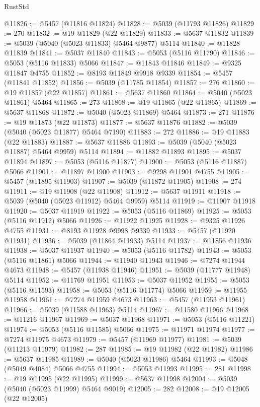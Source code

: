 \begin{lexlean}{RustStd}
\begin{coremodule}
@11826 := @5457 (@11816 @11824)
@11828 := @5039 (@11793 @11826)
@11829 := 270
@11832 := @19 @11829 (@22 @11829)
@11833 := @5637 @11832
@11839 := @5039 (@5040 (@5023 @11833) @5464 @9877) @5114
@11840 := @11828 @11839
@11841 := @5037 @11840
@11843 := @5053 (@5116 @11790)
@11846 := @5053 (@5116 @11833) @5066
@11847 := @11843 @11846
@11849 := @9325 @11847 @4755
@11852 := @8193 @11849 @9918 @9339
@11854 := @5457 (@11841 @11852)
@11856 := @5039 (@11785 @11854)
@11857 := 276
@11860 := @19 @11857 (@22 @11857)
@11861 := @5637 @11860
@11864 := @5040 (@5023 @11861) @5464
@11865 := 273
@11868 := @19 @11865 (@22 @11865)
@11869 := @5637 @11868
@11872 := @5040 (@5023 @11869) @5464
@11873 := 271
@11876 := @19 @11873 (@22 @11873)
@11877 := @5637 @11876
@11882 := @5039 (@5040 (@5023 @11877) @5464 @7190)
@11883 := 272
@11886 := @19 @11883 (@22 @11883)
@11887 := @5637 @11886
@11893 := @5039 (@5040 (@5023 @11887) @5464 @9959) @5114
@11894 := @11882 @11893
@11895 := @5037 @11894
@11897 := @5053 (@5116 @11877)
@11900 := @5053 (@5116 @11887) @5066
@11901 := @11897 @11900
@11903 := @9298 @11901 @4755
@11905 := @5457 (@11895 @11903)
@11907 := @5039 (@11872 @11905)
@11908 := 274
@11911 := @19 @11908 (@22 @11908)
@11912 := @5637 @11911
@11918 := @5039 (@5040 (@5023 @11912) @5464 @9959) @5114
@11919 := @11907 @11918
@11920 := @5037 @11919
@11922 := @5053 (@5116 @11869)
@11925 := @5053 (@5116 @11912) @5066
@11926 := @11922 @11925
@11928 := @9325 @11926 @4755
@11931 := @8193 @11928 @9998 @9339
@11933 := @5457 (@11920 @11931)
@11936 := @5039 (@11864 @11933) @5114
@11937 := @11856 @11936
@11938 := @5037 @11937
@11940 := @5053 (@5116 @11782)
@11943 := @5053 (@5116 @11861) @5066
@11944 := @11940 @11943
@11946 := @7274 @11944 @4673
@11948 := @5457 (@11938 @11946)
@11951 := @5039 (@11777 @11948) @5114
@11952 := @11769 @11951
@11953 := @5037 @11952
@11955 := @5053 (@5116 @11593)
@11958 := @5053 (@5116 @11774) @5066
@11959 := @11955 @11958
@11961 := @7274 @11959 @4673
@11963 := @5457 (@11953 @11961)
@11966 := @5039 (@11588 @11963) @5114
@11967 := @11580 @11966
@11968 := @11216 @11967
@11969 := @5037 @11968
@11971 := @5053 (@5116 @11221)
@11974 := @5053 (@5116 @11585) @5066
@11975 := @11971 @11974
@11977 := @7274 @11975 @4673
@11979 := @5457 (@11969 @11977)
@11981 := @5039 (@11213 @11979)
@11982 := 287
@11985 := @19 @11982 (@22 @11982)
@11986 := @5637 @11985
@11989 := @5040 (@5023 @11986) @5464
@11993 := @5048 (@5049 @4084) @5066 @4755
@11994 := @5053 @11993
@11995 := 281
@11998 := @19 @11995 (@22 @11995)
@11999 := @5637 @11998
@12004 := @5039 (@5040 (@5023 @11999) @5464 @9019)
@12005 := 282
@12008 := @19 @12005 (@22 @12005)

\end{coremodule}
\end{lexlean}

